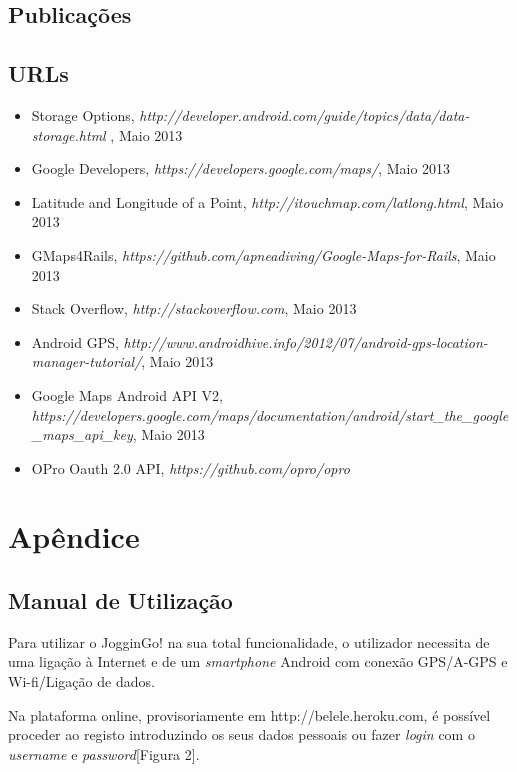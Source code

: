 \documentclass[15pt,a4paper]{article}
\begin{document}
\subsection{Publicações}

\subsection{URLs}

\begin{itemize}
\item Storage Options, \emph{http://developer.android.com/guide/topics/data/data-storage.html
}, Maio 2013
\item Google Developers, \emph{https://developers.google.com/maps/}, Maio 2013

\item Latitude and Longitude of a Point, \emph{http://itouchmap.com/latlong.html}, Maio 2013
\item GMaps4Rails, \emph{https://github.com/apneadiving/Google-Maps-for-Rails}, Maio 2013

\item Stack Overflow, \emph{http://stackoverflow.com}, Maio 2013

\item Android GPS, \emph{http://www.androidhive.info/2012/07/android-gps-location-manager-tutorial/}, Maio 2013

\item Google Maps Android API V2, \emph{https://developers.google.com/maps/documentation/android/start\_the\_google\_maps\_api\_key}, Maio 2013

\item OPro Oauth 2.0 API, \emph{https://github.com/opro/opro}

\end{itemize}


\newpage
\appendix
\section{Apêndice}
\subsection{Manual de Utilização}

Para utilizar o JogginGo! na sua total funcionalidade, o utilizador necessita de uma ligação à Internet e de um \textit{smartphone} Android com conexão GPS/A-GPS e Wi-fi/Ligação de dados.

Na plataforma online, provisoriamente em http://belele.heroku.com, é possível proceder ao registo introduzindo os seus dados pessoais ou fazer \textit{login} com o \textit{username} e \textit{password}[Figura 2].
\end{document}
